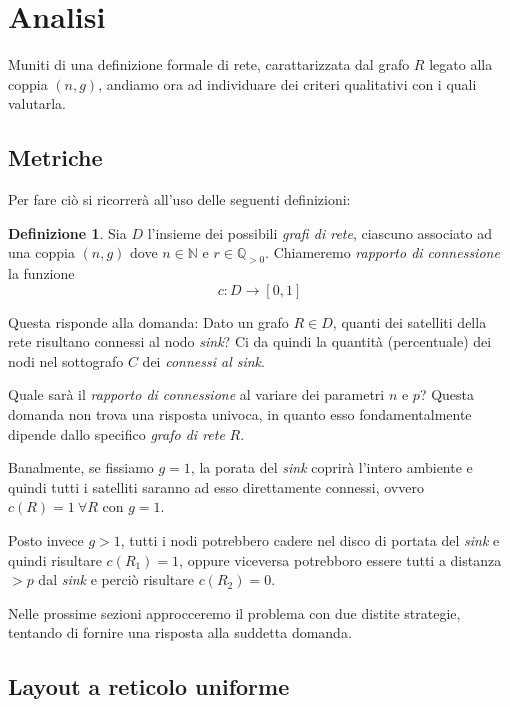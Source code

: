 \documentclass[a4paper,12pt]{article}
\theoremstyle{definition}
\newtheorem{definition}{Definizione}
\begin{document}

\section{Analisi}

Muniti di una definizione formale di rete, carattarizzata dal grafo $R$ legato alla coppia $(n, g)$, andiamo ora ad individuare dei criteri qualitativi con i quali valutarla.

\subsection{Metriche}

Per fare ciò si ricorrerà all'uso delle seguenti definizioni:

\begin{definition}
Sia $D$ l'insieme dei possibili \emph{grafi di rete}, ciascuno associato ad una coppia $(n, g)$ dove $n \in \mathbb{N}$ e $r \in \mathbb{Q}_{>0}$. Chiameremo \emph{rapporto di connessione} la funzione
\begin{equation*}
c \colon D \to [0, 1]
\end{equation*}
\end{definition}

Questa risponde alla domanda: Dato un grafo $R \in D$, quanti dei satelliti della rete risultano connessi al nodo \emph{sink}? Ci da quindi la quantità (percentuale) dei nodi nel sottografo $C$ dei \emph{connessi al sink}.

Quale sarà il \emph{rapporto di connessione} al variare dei parametri $n$ e $p$? Questa domanda non trova una risposta univoca, in quanto esso fondamentalmente dipende dallo specifico \emph{grafo di rete} $R$.

Banalmente, se fissiamo $g = 1$, la porata del \emph{sink} coprirà l'intero ambiente e quindi tutti i satelliti saranno ad esso direttamente connessi, ovvero $c(R) = 1 \ \forall R$ con $g = 1$.

Posto invece $g > 1$, tutti i nodi potrebbero cadere nel disco di portata del \emph{sink} e quindi risultare $c(R_1) = 1$, oppure viceversa potrebboro essere tutti a distanza $> p$ dal \emph{sink} e perciò risultare $c(R_2) = 0$.

Nelle prossime sezioni approcceremo il problema con due distite strategie, tentando di fornire una risposta alla suddetta domanda.

\subsection{Layout a reticolo uniforme}
\end{document}
